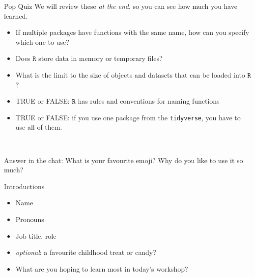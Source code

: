 \documentclass[
  11pt,
  ignorenonframetext,
]{beamer}
\providecommand{\tightlist}{%
  \setlength{\itemsep}{0pt}\setlength{\parskip}{0pt}}
\newcommand{\R}{\texttt{R}}
\newcommand{\fade}[1]{\textcolor[rgb]{0.66,0.66,0.66}{#1}}
\newcommand{\annote}[1]{{\footnotesize #1}}
\begin{document}
\begin{frame}[fragile]{Pop Quiz}
\protect\hypertarget{pop-quiz}{}
\annote{\fade{We will review these \textit{at the end}, so you can see how much you have learned.}}

\begin{itemize}
\tightlist
\item
  If multiple packages have functions with the same name, how can you
  specify which one to use?
\item
  Does \(\R\) store data in memory or temporary files?
\item
  What is the limit to the size of objects and datasets that can be
  loaded into \(\R\)?
\item
  TRUE or FALSE: \(\R\) has rules and conventions for naming functions
\item
  TRUE or FALSE: if you use one package from the \texttt{tidyverse}, you
  have to use all of them.
\end{itemize}

~

\begin{block}{Answer in the chat:}
\protect\hypertarget{answer-in-the-chat}{}
What is your favourite emoji? Why do you like to use it so much?
\end{block}
\end{frame}

\begin{frame}{Introductions}
\protect\hypertarget{introductions}{}
\begin{itemize}
\tightlist
\item
  Name
\item
  Pronouns
\item
  Job title, role
\item
  \emph{optional}: a favourite childhood treat or candy?
\end{itemize}

\begin{itemize}
\tightlist
\item
  What are you hoping to learn most in today's workshop?
\end{itemize}
\end{frame}
\end{document}
